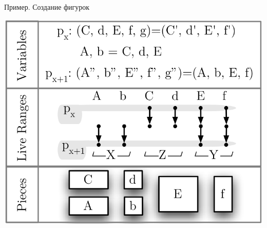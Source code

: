\documentclass[aspectratio=169
  , xcolor={svgnames}
  , hyperref={ colorlinks,citecolor=DeepPink4
             , linkcolor=DarkRed,urlcolor=DarkBlue}
  , russian
  ]{beamer}
\theoremstyle{exerciseStyle1}
\begin{document}
\begin{frame}[fragile]{Пример. Создание фигурок}
\begin{minipage}{.48\textwidth}
\begin{center}
\includegraphics[width=1\linewidth]{figures/creating-pieces}
\end{center}
\end{minipage}
\end{frame}
\end{document}
